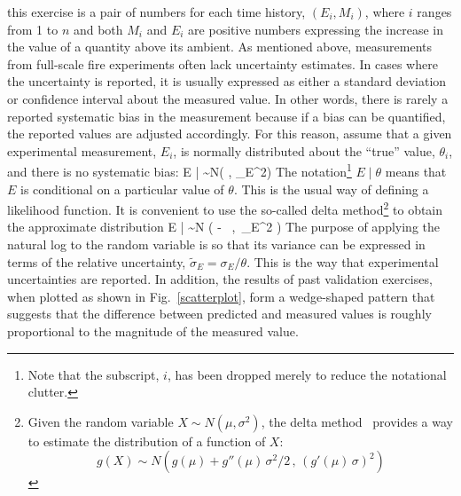this exercise is a pair of numbers for each time history, $(E_i,M_i)$, where $i$ ranges from 1 to $n$ and both $M_i$ and $E_i$ are positive numbers
expressing the increase in the value of a quantity above its ambient.
As mentioned above, measurements from full-scale fire experiments often lack uncertainty estimates. In cases where the uncertainty is
reported, it is usually expressed as either a standard deviation or confidence interval about the measured value. In other words, there is rarely
a reported systematic bias in the measurement because if a bias can be quantified, the reported values are adjusted accordingly.
For this reason, assume that a given experimental measurement, $E_i$, is normally
distributed about the ``true'' value, $\theta_i$, and there is no systematic bias:
\be
   E \; | \; \theta \sim N(\theta \; , \; \sigma_E^2) \label{expunc}
\ee
The notation\footnote{Note that the subscript, $i$, has been dropped merely to reduce the notational clutter.}
$E \; | \; \theta$ means that $E$ is conditional on a particular value of $\theta$.
This is the usual way of defining a likelihood function.
It is convenient to use the so-called delta method\footnote{Given the random variable $X \sim N(\mu,\sigma^2)$, the
delta method~\cite{Oehlert:1992} provides a way to estimate the distribution of a function of $X$:
$$g(X) \sim N \left( g(\mu) + g''(\mu) \, \sigma^2/2 \, , \, (g'(\mu) \, \sigma)^2\right)$$} to obtain the approximate distribution
\be
   \ln E \; | \; \theta \sim N \left( \ln \theta -  \, , \,\widetilde{\sigma}_E^2 \right) \label{eeq}
\ee
The purpose of applying the natural log to the random variable is so that its variance can be expressed in terms of the
relative uncertainty, $\widetilde{\sigma}_E=\sigma_E/\theta$. This is the way that experimental uncertainties are reported. In addition,
the results of past validation exercises, when plotted as shown in Fig.~\ref{scatterplot}, form a wedge-shaped pattern that suggests
that the difference between predicted and measured values is roughly proportional to the magnitude of the measured value.

